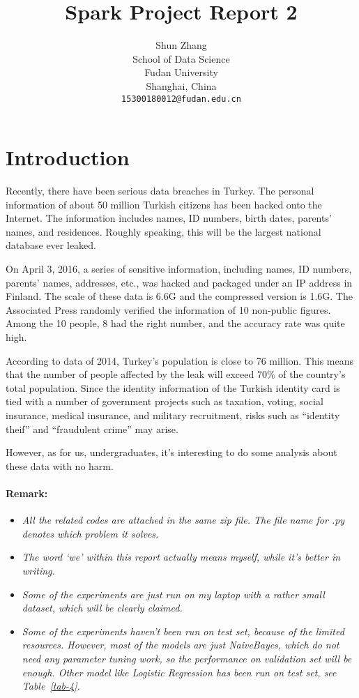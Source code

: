 \documentclass{article}
\title{Spark Project Report 2}
\author{
  Shun Zhang \\
  School of Data Science\\
  Fudan University\\
  Shanghai, China \\
  \texttt{15300180012@fudan.edu.cn} \\
}
\begin{document}

\maketitle

\section{Introduction}

Recently, there have been serious data breaches in Turkey. The personal information of about 50 million Turkish citizens has been hacked onto the Internet. The information includes names, ID numbers, birth dates, parents' names, and residences. Roughly speaking, this will be the largest national database ever leaked.

On April 3, 2016, a series of sensitive information, including names, ID numbers, parents' names, addresses, etc., was hacked and packaged under an IP address in Finland. The scale of these data is 6.6G and the compressed version is 1.6G. The Associated Press randomly verified the information of 10 non-public figures. Among the 10 people, 8 had the right number, and the accuracy rate was quite high. 

According to data of 2014, Turkey's population is close to 76 million. This means that the number of people affected by the leak will exceed $70\%$ of the country's total population. Since the identity information of the Turkish identity card is tied with a number of government projects such as taxation, voting, social insurance, medical insurance, and military recruitment, risks such as ``identity theif'' and ``fraudulent crime'' may arise.

However, as for us, undergraduates, it's interesting to do some analysis about these data with no harm.

\paragraph{Remark:}

\begin{itemize}
\item \emph{All the related codes are attached in the same zip file. The file name for .py denotes which problem it solves.}
\item \emph{The word `we' within this report actually means myself, while it's better in writing.} 
\item \emph{Some of the experiments are just run on my laptop with a rather small dataset, which will be clearly claimed.}
\item \emph{Some of the experiments haven't been run on test set, because of the limited resources. However, most of the models are just NaiveBayes, which do not need any parameter tuning work, so the performance on validation set will be enough. Other model like Logistic Regression has been run on test set, see Table~\ref{tab-4}.}
\end{itemize}
\end{document}
